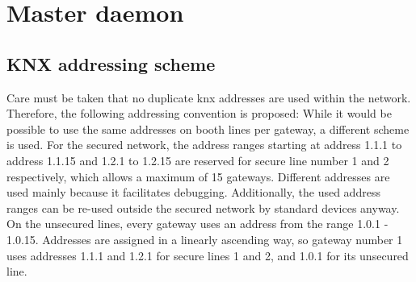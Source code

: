 

\section{Master daemon}

\subsection{KNX addressing scheme}

Care must be taken that no duplicate knx addresses are used within the network. Therefore, the following addressing convention is proposed:
While it would be possible to use the same addresses on booth lines per gateway, a different scheme is used.
For the secured network, the address ranges starting at address 1.1.1 to address 1.1.15 and 1.2.1 to 1.2.15 are reserved for secure line number
1 and 2 respectively, which allows a maximum of 15 gateways. Different addresses are used mainly because it facilitates debugging. Additionally, the used
address ranges can be re-used outside the secured network by standard devices anyway.
On the unsecured lines, every gateway uses an address from the range 1.0.1 - 1.0.15. Addresses are assigned in a linearly ascending way, so gateway number 1
uses addresses 1.1.1 and 1.2.1 for secure lines 1 and 2, and 1.0.1 for its unsecured line.



